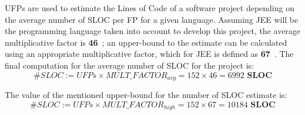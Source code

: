 UFPs are used to estimate the Lines of Code of a software project depending on the average number of SLOC per FP for a given language. Assuming JEE will be the programming language taken into account to develop this project, the average multiplicative factor is \textbf{46}~\cite{qsm}; an upper-bound to the estimate can be calculated using an appropriate multiplicative factor, which for JEE is defined as \textbf{67}~\cite{qsm}.
\newline
\newline
The final computation for the average number of SLOC for the project is:
\begin{equation}
\# SLOC := UFPs \times MULT\_ FACTOR_{avg} = 152 \times 46 = 6992 \textbf{ SLOC}
\end{equation}

The value of the mentioned upper-bound for the number of SLOC estimate is:
\begin{equation}
\# SLOC := UFPs \times MULT\_ FACTOR_{high} = 152 \times 67 = 10184 \textbf{ SLOC}
\end{equation}